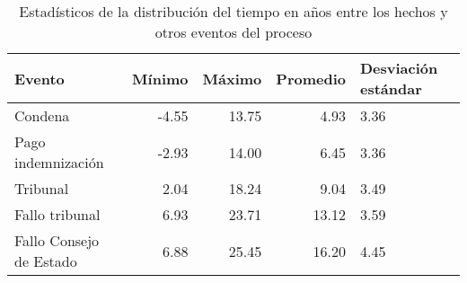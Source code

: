 \begin{table}[h]
\centering
\caption{Estadísticos de la distribución del
tiempo en años entre los hechos y otros eventos del proceso} 
\label{tab:hechos-evento}
\begin{tabular}{lrrrR{2cm}}
  \hline
Evento & Mínimo & Máximo & Promedio & Desviación estándar \\ 
  \hline
Condena & -4.55 & 13.75 & 4.93 & 3.36 \\ 
  Pago indemnización & -2.93 & 14.00 & 6.45 & 3.36 \\ 
  Tribunal & 2.04 & 18.24 & 9.04 & 3.49 \\ 
  Fallo tribunal & 6.93 & 23.71 & 13.12 & 3.59 \\ 
  Fallo Consejo de Estado & 6.88 & 25.45 & 16.20 & 4.45 \\ 
   \hline
\end{tabular}
\end{table}
